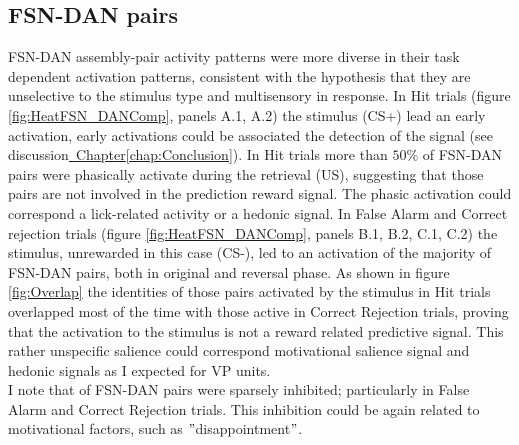 \subsection{FSN-DAN pairs}
FSN-DAN assembly-pair activity patterns were more diverse in their task dependent activation patterns, consistent with the hypothesis that they are unselective to the stimulus type and multisensory in response. In Hit trials (figure \ref{fig:HeatFSN_DANComp}, panels A.1, A.2) the stimulus (CS+) lead an early activation, early activations could be associated the detection of the signal (see discussion\hyperref[chap:Conclusion]{~Chapter\ref*{chap:Conclusion}}). In Hit trials more than $50\%$ of FSN-DAN pairs were phasically activate during the retrieval (US), suggesting that those pairs are not involved in the prediction reward signal. The phasic activation could correspond a lick-related activity or a hedonic signal. In False Alarm and Correct rejection trials (figure \ref{fig:HeatFSN_DANComp}, panels B.1, B.2, C.1, C.2) the stimulus, unrewarded in this case (CS-), led to an activation of the majority of FSN-DAN pairs, both in original and reversal phase. As shown in figure \ref{fig:Overlap} the identities of those pairs activated by the stimulus in Hit trials overlapped most of the time with those active in Correct Rejection trials, proving that the activation to the stimulus is not a reward related predictive signal. This rather unspecific salience could correspond motivational salience signal and hedonic signals as I expected for VP units.\\ I note that of FSN-DAN pairs were sparsely inhibited; particularly in False Alarm and Correct Rejection trials. This inhibition could be again related to motivational factors, such as $"$disappointment$"$. 
